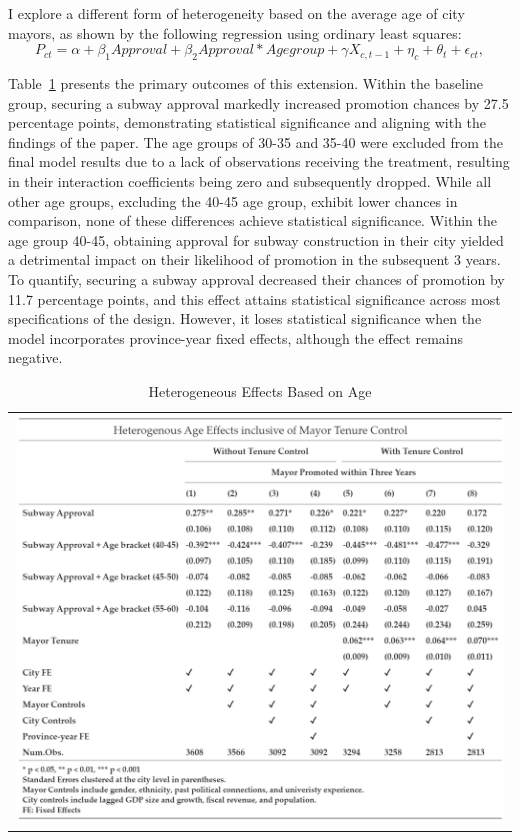 \documentclass[12pt, ]{article}
\begin{document}
I explore a different form of heterogeneity based on the average age of
city mayors, as shown by the following regression using ordinary least
squares:
\[P_{ct} = \alpha + \beta_{1}Approval + \beta_{2}Approval * Age group + \gamma X_{c,t - 1} + \eta_{c} + \theta_{t} + \epsilon_{ct},\]

Table~\ref{tbl-extension} presents the primary outcomes of this
extension. Within the baseline group, securing a subway approval
markedly increased promotion chances by 27.5 percentage points,
demonstrating statistical significance and aligning with the findings of
the \citet{lei2022private} paper. The age groups of 30-35 and 35-40 were
excluded from the final model results due to a lack of observations
receiving the treatment, resulting in their interaction coefficients
being zero and subsequently dropped. While all other age groups,
excluding the 40-45 age group, exhibit lower chances in comparison, none
of these differences achieve statistical significance. Within the age
group 40-45, obtaining approval for subway construction in their city
yielded a detrimental impact on their likelihood of promotion in the
subsequent 3 years. To quantify, securing a subway approval decreased
their chances of promotion by 11.7 percentage points, and this effect
attains statistical significance across most specifications of the
design. However, it loses statistical significance when the model
incorporates province-year fixed effects, although the effect remains
negative.

\hypertarget{tbl-extension}{}
\begin{longtable}[]{@{}l@{}}
\caption{\label{tbl-extension}Heterogeneous Effects Based on
Age}\tabularnewline
\toprule\noalign{}
\endfirsthead
\endhead
\bottomrule\noalign{}
\endlastfoot
\includegraphics{tables/did_extension.png} \\
\end{longtable}
\end{document}
